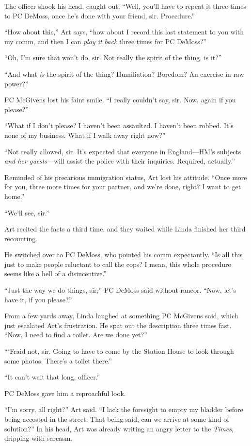 The officer shook his head, caught out. “Well, you’ll have to
repeat it three times to PC DeMoss, once he’s done with your
friend, sir. Procedure.”

“How about this,” Art says, “how about I record this last statement
to you with my comm, and then I can \emph{play it back} three times
for PC DeMoss?”

“Oh, I’m sure that won’t do, sir. Not really the spirit of the
thing, is it?”

“And what \emph{is} the spirit of the thing? Humiliation? Boredom?
An exercise in raw power?”

PC McGivens lost his faint smile. “I really couldn’t say, sir. Now,
again if you please?”

“What if I don’t please? I haven’t been assaulted. I haven’t been
robbed. It’s none of my business. What if I walk away right now?”

“Not really allowed, sir. It’s expected that everyone in
England—HM’s subjects \emph{and her guests}—will assist the police
with their inquiries. Required, actually.”

Reminded of his precarious immigration status, Art lost his
attitude. “Once more for you, three more times for your partner,
and we’re done, right? I want to get home.”

“We’ll see, sir.”

Art recited the facts a third time, and they waited while Linda
finished her third recounting.

He switched over to PC DeMoss, who pointed his comm expectantly.
“Is all this just to make people reluctant to call the cops? I
mean, this whole procedure seems like a hell of a disincentive.”

“Just the way we do things, sir,” PC DeMoss said without rancor.
“Now, let’s have it, if you please?”

From a few yards away, Linda laughed at something PC McGivens said,
which just escalated Art’s frustration. He spat out the description
three times fast. “Now, I need to find a toilet. Are we done yet?”

“‘Fraid not, sir. Going to have to come by the Station House to
look through some photos. There’s a toilet there.”

“It can’t wait that long, officer.”

PC DeMoss gave him a reproachful look.

“I’m sorry, all right?” Art said. “I lack the foresight to empty my
bladder before being accosted in the street. That being said, can
we arrive at some kind of solution?” In his head, Art was already
writing an angry letter to the \emph{Times}, dripping with
sarcasm.

